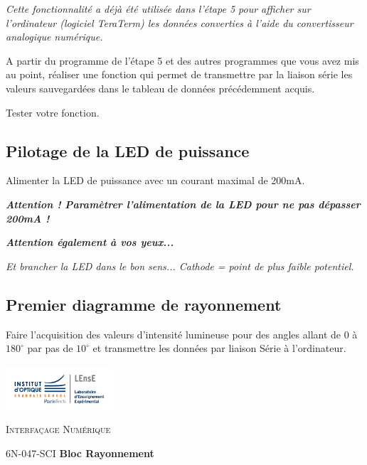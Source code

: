 \documentclass[a4paper,11pt,titlepage]{article} %
\begin{document}
\textit{Cette fonctionnalité a déjà été utilisée dans l'étape 5 pour afficher sur l'ordinateur (logiciel TeraTerm) les données converties à l'aide du convertisseur analogique numérique.}

\medskip

\Manip A partir du programme de l'étape 5 et des autres programmes que vous avez mis au point, réaliser une fonction qui permet de transmettre par la liaison série les valeurs sauvegardées dans le tableau de données précédemment acquis.

\Manip Tester votre fonction.

\subsection{Pilotage de la LED de puissance}

\Manip Alimenter la LED de puissance avec un courant maximal de 200mA. 

\bigskip

\textbf{\textit{Attention ! Paramètrer l'alimentation de la LED pour ne pas dépasser 200mA !}}

\textbf{\textit{Attention également à vos yeux...}}

\textit{Et brancher la LED dans le bon sens... Cathode = point de plus faible potentiel.}

\subsection{Premier diagramme de rayonnement}

\Manip Faire l'acquisition des valeurs d'intensité lumineuse pour des angles allant de $0$ à $180^\circ{}$ par pas de $10^\circ{}$ et transmettre les données par liaison Série à l'ordinateur.


\cleardoublepage
\strut %

\begin{minipage}[c]{.25\linewidth}
	\includegraphics[width=4cm]{images/Logo-LEnsE.png}
\end{minipage} \hfill
\begin{minipage}[c]{.4\linewidth}

\begin{center}
\vspace{0.3cm}
{\Large \textsc{Interfaçage Numérique}}

\medskip

6N-047-SCI \qquad \textbf{\large Bloc Rayonnement}

\end{center}
\end{minipage}\hfill
\end{document}
